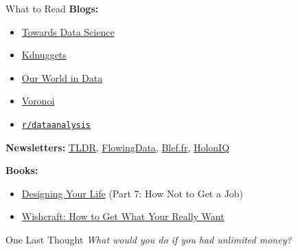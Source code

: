 \documentclass[10pt,a4paper]{article}
\begin{document}
\begin{multicols}{3}
\begin{textboxYellow}{What to Read}
\textbf{Blogs:}
\begin{itemize}
    \item \href{https://towardsdatascience.com/}{Towards Data Science}
    \item \href{https://www.kdnuggets.com/}{Kdnuggets}
    \item \href{https://ourworldindata.org/}{Our World in Data}
    \item \href{https://www.voronoiapp.com/}{Voronoi}
    \item \href{https://reddit.com/r/dataanalysis/}{\texttt{r/dataanalysis}}
\end{itemize}
\textbf{Newsletters:} \href{https://tldr.tech/newsletters}{TLDR}, \href{https://flowingdata.com/newsletter/}{FlowingData}, \href{https://www.blef.fr/}{Blef.fr}, \href{https://www.holoniq.com/newsletters}{HolonIQ}

\textbf{Books:}
\begin{itemize}
    \item \href{https://www.amazon.com/Designing-Your-Life-Well-Lived-Joyful/dp/1101923083}{Designing Your Life} (Part 7: How Not to Get a Job)
    \item \href{https://www.amazon.com/Wishcraft-How-What-Really-Want/dp/0345465180}{Wishcraft: How to Get What Your Really Want}
\end{itemize}
\end{textboxYellow}

\begin{textbox}{One Last Thought}
\emph{What would you do if you had unlimited money?}
\end{textbox}


\date{\today}
\end{multicols}
\end{document}
